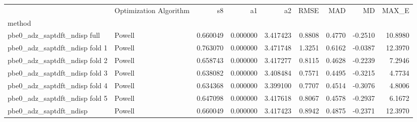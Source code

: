 \begin{tabular}{llrrrrrrr}
 & Optimization Algorithm & s8 & a1 & a2 & RMSE & MAD & MD & MAX_E \\
method &  &  &  &  &  &  &  &  \\
pbe0_adz_saptdft_ndisp full & Powell & 0.660049 & 0.000000 & 3.417423 & 0.8808 & 0.4770 & -0.2510 & 10.8980 \\
pbe0_adz_saptdft_ndisp fold 1 & Powell & 0.763070 & 0.000000 & 3.471748 & 1.3251 & 0.6162 & -0.0387 & 12.3970 \\
pbe0_adz_saptdft_ndisp fold 2 & Powell & 0.658743 & 0.000000 & 3.417277 & 0.8115 & 0.4628 & -0.2239 & 7.2946 \\
pbe0_adz_saptdft_ndisp fold 3 & Powell & 0.638082 & 0.000000 & 3.408484 & 0.7571 & 0.4495 & -0.3215 & 4.7734 \\
pbe0_adz_saptdft_ndisp fold 4 & Powell & 0.634368 & 0.000000 & 3.399100 & 0.7707 & 0.4514 & -0.3076 & 4.8006 \\
pbe0_adz_saptdft_ndisp fold 5 & Powell & 0.647098 & 0.000000 & 3.417618 & 0.8067 & 0.4578 & -0.2937 & 6.1672 \\
pbe0_adz_saptdft_ndisp & Powell & 0.660049 & 0.000000 & 3.417423 & 0.8942 & 0.4875 & -0.2371 & 12.3970 \\
\end{tabular}
